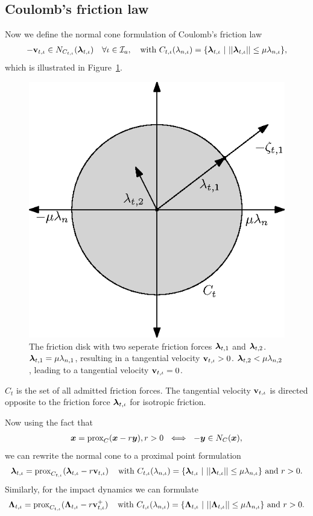 \documentclass[../DC2017114Bouma.tex]{subfiles}
\begin{document}
\subsection{Coulomb's friction law}
Now we define the normal cone formulation of Coulomb's friction law
\begin{align}
-\mathbf{v}_{t,\iota} \in N_{C_{t,\iota}}(\boldsymbol{\lambda}_{t,\iota})\quad \forall \iota\in\mathcal{I}_a,\quad \text{with }C_{t,\iota}(\lambda_{n,\iota}) = \{\boldsymbol{\lambda}_{t,\iota}\ |\ ||\boldsymbol{\lambda}_{t,\iota}|| \leq \mu\lambda_{n,\iota}\},
\end{align}
which is illustrated in Figure~\ref{fig:appfrictiondisk}.  

\begin{figure}[h]
\centering
\includegraphics[width=.4\textwidth]{frictiondisk.eps}\caption{The friction disk with two seperate friction forces $\boldsymbol{\lambda}_{t,1}$ and $\boldsymbol{\lambda}_{t,2}$. $\boldsymbol{\lambda}_{t,1} = \mu\lambda_{n,1}$, resulting in a tangential velocity $\mathbf{v}_{t,\iota}>0$. $\boldsymbol{\lambda}_{t,2}<\mu\lambda_{n,2}$, leading to a tangential velocity $\mathbf{v}_{t,\iota}=0$.}\label{fig:appfrictiondisk}
\end{figure}

$C_t$ is the set of all admitted friction forces. The tangential velocity $\mathbf{v}_{t,\iota}$ is directed opposite to the friction force $\boldsymbol{\lambda}_{t,\iota}$ for isotropic friction. 

Now using the fact that
\begin{align}
{\boldsymbol{x}} = \operatorname{\text{prox}}_C({\boldsymbol{x}} -r{\boldsymbol{y}}), r > 0\ \iff\ -{\boldsymbol{y}}\in N_C({\boldsymbol{x}}),
\end{align}
we can rewrite the normal cone to a proximal point formulation
\begin{align}
\boldsymbol{\lambda}_{t,\iota} = \operatorname{\text{prox}}_{C_{t,\iota}}(\boldsymbol{\lambda}_{t,\iota} - r\mathbf{v}_{t,\iota})\,\quad\text{with }C_{t,\iota}(\lambda_{n,\iota}) = \{\boldsymbol{\lambda}_{t,\iota}\ |\ ||\boldsymbol{\lambda}_{t,\iota}|| \leq \mu\lambda_{n,\iota}\}\text{ and }r>0.
\end{align}
Similarly, for the impact dynamics we can formulate
\begin{align}
\boldsymbol{\Lambda}_{t,\iota} = \operatorname{\text{prox}}_{C_{t,\iota}}(\boldsymbol{\Lambda}_{t,\iota} - r\mathbf{v}^+_{t,\iota})\,\quad \text{with }C_{t,\iota}(\lambda_{n,\iota}) = \{\boldsymbol{\Lambda}_{t,\iota}\ |\ ||\boldsymbol{\Lambda}_{t,\iota}|| \leq \mu\Lambda_{n,\iota}\}\text{ and }r>0.
\end{align}
\end{document}
